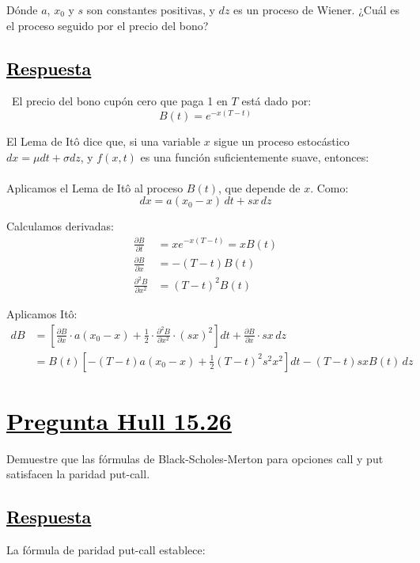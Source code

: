 \documentclass[12pt]{article}
\newcommand{\subrayadoRojo}[1]{{\color{rojoudp}\underline{\textcolor{black}{#1}}}}
\renewcommand{\thesection}{Pregunta \arabic{section}}
\newcommand{\pregunta}[1]{%
  \section*{\subrayadoRojo{\thesection  #1}}%
  \stepcounter{section}%
}
\newcounter{subpreg}
\newcommand{\subpregunta}[1]{%
  \subsection*{\subrayadoRojo{#1}}%
}
\begin{document}
Dónde \( a \), \( x_0 \) y \( s \) son constantes positivas, y \( dz \) es un proceso de Wiener. ¿Cuál es el proceso seguido por el precio del bono?

\subpregunta{Respuesta}

\ El precio del bono cupón cero que paga 1 en \( T \) está dado por:
\[
B(t) = e^{-x(T - t)}
\]

\noindent
El Lema de Itô dice que, si una variable \( x \) sigue un proceso estocástico \( dx = \mu dt + \sigma dz \), y \( f(x,t) \) es una función suficientemente suave, entonces:\\
\formula{\ito}\\

Aplicamos el Lema de Itô al proceso \( B(t) \), que depende de \( x \). Como:
\[
dx = a(x_0 - x)\,dt + s x\,dz
\]

Calculamos derivadas:
\begin{align*}
    \frac{\partial B}{\partial t} &= x e^{-x(T - t)} = x B(t) \\
    \frac{\partial B}{\partial x} &= - (T - t) B(t) \\
    \frac{\partial^2 B}{\partial x^2} &= (T - t)^2 B(t)
\end{align*}

Aplicamos Itô:
\begin{align*}
    dB &= \left[ \frac{\partial B}{\partial x} \cdot a(x_0 - x) + \frac{1}{2} \cdot \frac{\partial^2 B}{\partial x^2} \cdot (s x)^2 \right] dt + \frac{\partial B}{\partial x} \cdot s x \, dz \\
    &= B(t) \left[ - (T - t) a (x_0 - x) + \frac{1}{2} (T - t)^2 s^2 x^2 \right] dt - (T - t) s x B(t) \, dz
\end{align*}

\pregunta{ Hull 15.26}

Demuestre que las fórmulas de Black-Scholes-Merton para opciones call y put satisfacen la paridad put-call.

\subpregunta{Respuesta}
\noindent La fórmula de paridad put-call establece:\\
\formula{\putcall}\\[0.5em]
\end{document}
